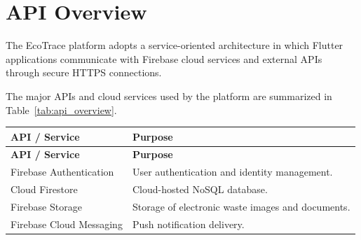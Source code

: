\section{API Overview}
\label{sec:api-overview}

The EcoTrace platform adopts a service-oriented architecture in which
Flutter applications communicate with Firebase cloud services and
external APIs through secure HTTPS connections.

The major APIs and cloud services used by the platform are summarized
in Table~\ref{tab:api_overview}.

\begin{longtable}{|p{5cm}|p{8cm}|}

\hline

\textbf{API / Service}

&

\textbf{Purpose}

\\

\hline

\endfirsthead

\hline

\textbf{API / Service}

&

\textbf{Purpose}

\\

\hline

\endhead

Firebase Authentication

&

User authentication and identity management.

\\

\hline

Cloud Firestore

&

Cloud-hosted NoSQL database.

\\

\hline

Firebase Storage

&

Storage of electronic waste images and documents.

\\

\hline

Firebase Cloud Messaging

&

Push notification delivery.


\end{longtable}
